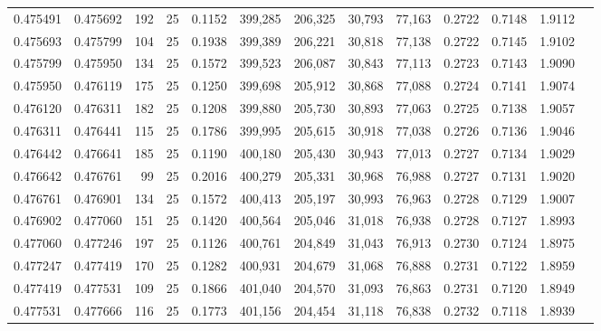 \begin{tabular}{rrrrrrrrrrrrr}
0.475491 & 0.475692 &   192 &  25 &                                     0.1152 & 399,285 & 206,325 &  30,793 &  77,163 & 0.2722 & 0.7148 & 1.9112 \\
0.475693 & 0.475799 &   104 &  25 &                                     0.1938 & 399,389 & 206,221 &  30,818 &  77,138 & 0.2722 & 0.7145 & 1.9102 \\
0.475799 & 0.475950 &   134 &  25 &                                     0.1572 & 399,523 & 206,087 &  30,843 &  77,113 & 0.2723 & 0.7143 & 1.9090 \\
0.475950 & 0.476119 &   175 &  25 &                                     0.1250 & 399,698 & 205,912 &  30,868 &  77,088 & 0.2724 & 0.7141 & 1.9074 \\
0.476120 & 0.476311 &   182 &  25 &                                     0.1208 & 399,880 & 205,730 &  30,893 &  77,063 & 0.2725 & 0.7138 & 1.9057 \\
0.476311 & 0.476441 &   115 &  25 &                                     0.1786 & 399,995 & 205,615 &  30,918 &  77,038 & 0.2726 & 0.7136 & 1.9046 \\
0.476442 & 0.476641 &   185 &  25 &                                     0.1190 & 400,180 & 205,430 &  30,943 &  77,013 & 0.2727 & 0.7134 & 1.9029 \\
0.476642 & 0.476761 &    99 &  25 &                                     0.2016 & 400,279 & 205,331 &  30,968 &  76,988 & 0.2727 & 0.7131 & 1.9020 \\
0.476761 & 0.476901 &   134 &  25 &                                     0.1572 & 400,413 & 205,197 &  30,993 &  76,963 & 0.2728 & 0.7129 & 1.9007 \\
0.476902 & 0.477060 &   151 &  25 &                                     0.1420 & 400,564 & 205,046 &  31,018 &  76,938 & 0.2728 & 0.7127 & 1.8993 \\
0.477060 & 0.477246 &   197 &  25 &                                     0.1126 & 400,761 & 204,849 &  31,043 &  76,913 & 0.2730 & 0.7124 & 1.8975 \\
0.477247 & 0.477419 &   170 &  25 &                                     0.1282 & 400,931 & 204,679 &  31,068 &  76,888 & 0.2731 & 0.7122 & 1.8959 \\
0.477419 & 0.477531 &   109 &  25 &                                     0.1866 & 401,040 & 204,570 &  31,093 &  76,863 & 0.2731 & 0.7120 & 1.8949 \\
0.477531 & 0.477666 &   116 &  25 &                                     0.1773 & 401,156 & 204,454 &  31,118 &  76,838 & 0.2732 & 0.7118 & 1.8939 \\

\end{tabular}
